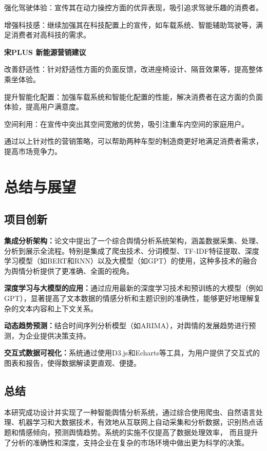 \documentclass[UTF8,a4paper,15pt,titlepage,oneside]{ctexbook}
\begin{document}
\begin{mdframed}[backgroundcolor=morandiLight!30, linecolor=morandiDark, linewidth=1pt]
强化驾驶体验：宣传其在动力操控方面的优异表现，吸引追求驾驶乐趣的消费者。

增强科技感：继续加强其在科技配置上的宣传，如车载系统、智能辅助驾驶等，满足消费者对高科技的需求。

\noindent
\textbf{宋PLUS 新能源营销建议}


改善舒适性：针对舒适性方面的负面反馈，改进座椅设计、隔音效果等，提高整体乘坐体验。

提升智能化配置：加强车载系统和智能化配置的性能，解决消费者在这方面的负面体验，提高用户满意度。

空间利用：在宣传中突出其空间宽敞的优势，吸引注重车内空间的家庭用户。

通过以上针对性的营销策略，可以帮助两种车型的制造商更好地满足消费者需求，提高市场竞争力。

\end{mdframed}

\section{总结与展望}

\subsection{项目创新}

\vskip 0.2cm
\noindent
\textbf{集成分析架构：}论文中提出了一个综合舆情分析系统架构，涵盖数据采集、处理、分析到展示全流程。特别是集成了爬虫技术、分词模型、TF-IDF特征提取、深度学习模型（如BERT和RNN）以及大模型（如GPT）的使用，这种多技术的融合为舆情分析提供了更准确、全面的视角。

\vskip 0.2cm
\noindent
\textbf{深度学习与大模型的应用：}通过应用最新的深度学习技术和预训练的大模型（例如GPT），显著提高了文本数据的情感分析和主题识别的准确性，能够更好地理解复杂的文本内容和上下文关系。

\vskip 0.2cm
\noindent
\textbf{动态趋势预测：}结合时间序列分析模型（如ARIMA），对舆情的发展趋势进行预测，为企业提供决策支持。

\vskip 0.2cm
\noindent
\textbf{交互式数据可视化：}系统通过使用D3.js和Echarts等工具，为用户提供了交互式的图表和报告，使得数据解读更直观、便捷。
  
\subsection{总结}

本研究成功设计并实现了一种智能舆情分析系统，通过综合使用爬虫、自然语言处理、机器学习和大数据技术，有效地从互联网上自动采集和分析数据，识别热点话题和情感倾向，预测舆情趋势。系统的实施不仅提高了数据处理效率，
而且提升了分析的准确性和深度，支持企业在复杂的市场环境中做出更为科学的决策。
\end{document}
